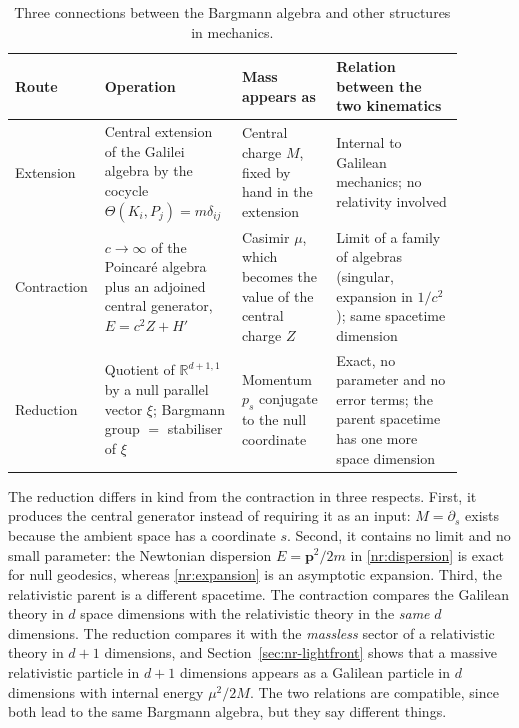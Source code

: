 \begin{table}[ht]
\centering
\footnotesize
\setlength{\tabcolsep}{4pt}
\renewcommand{\arraystretch}{1.25}
\begin{tabular}{@{}p{0.13\linewidth}p{0.29\linewidth}p{0.20\linewidth}p{0.27\linewidth}@{}}
\toprule
\textbf{Route} & \textbf{Operation} & \textbf{Mass appears as} & \textbf{Relation between the two kinematics}\\
\midrule
Extension &
Central extension of the Galilei algebra by the cocycle $\Theta(K_i,P_j)=m\delta_{ij}$ &
Central charge $M$, fixed by hand in the extension &
Internal to Galilean mechanics; no relativity involved\\
Contraction &
$c\to\infty$ of the Poincar\'e algebra plus an adjoined central generator, $E=c^2Z+H'$ &
Casimir $\mu$, which becomes the value of the central charge $Z$ &
Limit of a family of algebras (singular, expansion in $1/c^2$); same spacetime dimension\\
Reduction &
Quotient of $\mathbb{R}^{d+1,1}$ by a null parallel vector $\xi$; Bargmann group $=$ stabiliser of $\xi$ &
Momentum $p_s$ conjugate to the null coordinate &
Exact, no parameter and no error terms; the parent spacetime has one more space dimension\\
\bottomrule
\end{tabular}
\caption{Three connections between the Bargmann algebra and other structures in
mechanics.}
\label{tab:nr-routes}
\end{table}

The reduction differs in kind from the contraction in three respects.
First, it produces the central generator instead of requiring it as an input:
$M=\partial_s$ exists because the ambient space has a coordinate $s$.
Second, it contains no limit and no small parameter: the Newtonian
dispersion $E=\mathbf{p}^2/2m$ in \eqref{nr:dispersion} is exact for null
geodesics, whereas \eqref{nr:expansion} is an asymptotic expansion. Third, the
relativistic parent is a different spacetime. The contraction compares the
Galilean theory in $d$ space dimensions with the relativistic theory in the
\emph{same} $d$ dimensions. The reduction compares it with the
\emph{massless} sector of a relativistic theory in $d+1$ dimensions, and
Section~\ref{sec:nr-lightfront} shows that a massive relativistic particle in
$d+1$ dimensions appears as a Galilean particle in $d$ dimensions with internal
energy $\mu^2/2M$. The two relations are compatible, since both lead to the
same Bargmann algebra, but they say different things.

